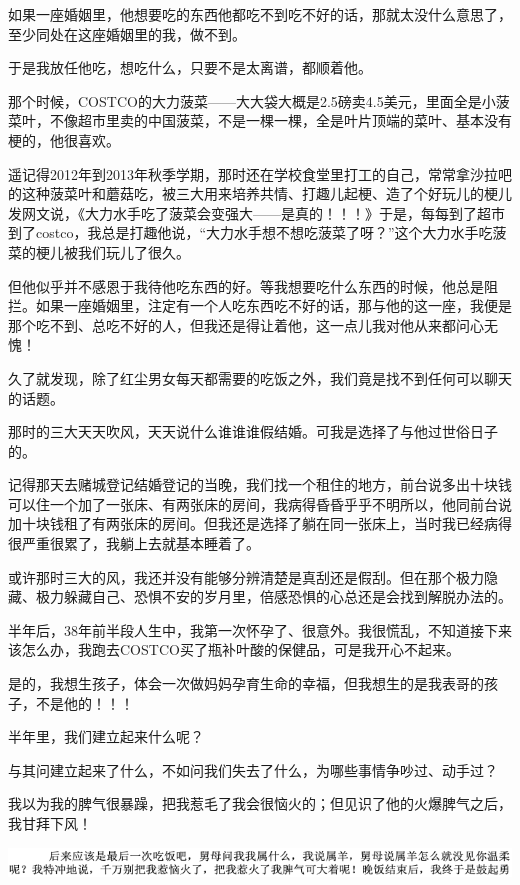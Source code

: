 \documentclass[9pt, b5paper]{article}
\begin{document}
如果一座婚姻里，他想要吃的东西他都吃不到吃不好的话，那就太没什么意思了，至少同处在这座婚姻里的我，做不到。

于是我放任他吃，想吃什么，只要不是太离谱，都顺着他。

那个时候，COSTCO的大力菠菜——大大袋大概是2.5磅卖4.5美元，里面全是小菠菜叶，不像超市里卖的中国菠菜，不是一棵一棵，全是叶片顶端的菜叶、基本没有梗的，他很喜欢。

遥记得2012年到2013年秋季学期，那时还在学校食堂里打工的自己，常常拿沙拉吧的这种菠菜叶和蘑菇吃，被三大用来培养共情、打趣儿起梗、造了个好玩儿的梗儿发网文说，《大力水手吃了菠菜会变强大——是真的！！！》于是，每每到了超市到了costco，我总是打趣他说，“大力水手想不想吃菠菜了呀？”这个大力水手吃菠菜的梗儿被我们玩儿了很久。

但他似乎并不感恩于我待他吃东西的好。等我想要吃什么东西的时候，他总是阻拦。如果一座婚姻里，注定有一个人吃东西吃不好的话，那与他的这一座，我便是那个吃不到、总吃不好的人，但我还是得让着他，这一点儿我对他从来都问心无愧！

久了就发现，除了红尘男女每天都需要的吃饭之外，我们竟是找不到任何可以聊天的话题。

那时的三大天天吹风，天天说什么谁谁谁假结婚。可我是选择了与他过世俗日子的。

记得那天去赌城登记结婚登记的当晚，我们找一个租住的地方，前台说多出十块钱可以住一个加了一张床、有两张床的房间，我病得昏昏乎乎不明所以，他同前台说加十块钱租了有两张床的房间。但我还是选择了躺在同一张床上，当时我已经病得很严重很累了，我躺上去就基本睡着了。

或许那时三大的风，我还并没有能够分辨清楚是真刮还是假刮。但在那个极力隐藏、极力躲藏自己、恐惧不安的岁月里，倍感恐惧的心总还是会找到解脱办法的。

半年后，38年前半段人生中，我第一次怀孕了、很意外。我很慌乱，不知道接下来该怎么办，我跑去COSTCO买了瓶补叶酸的保健品，可是我开心不起来。

是的，我想生孩子，体会一次做妈妈孕育生命的幸福，但我想生的是我表哥的孩子，不是他的！！！

半年里，我们建立起来什么呢？

与其问建立起来了什么，不如问我们失去了什么，为哪些事情争吵过、动手过？

我以为我的脾气很暴躁，把我惹毛了我会很恼火的；但见识了他的火爆脾气之后，我甘拜下风！

\begin{center}
\includegraphics[width=.9\linewidth]{./pic/backups_plans_20210427_195919.png}
\end{center}
\end{document}
